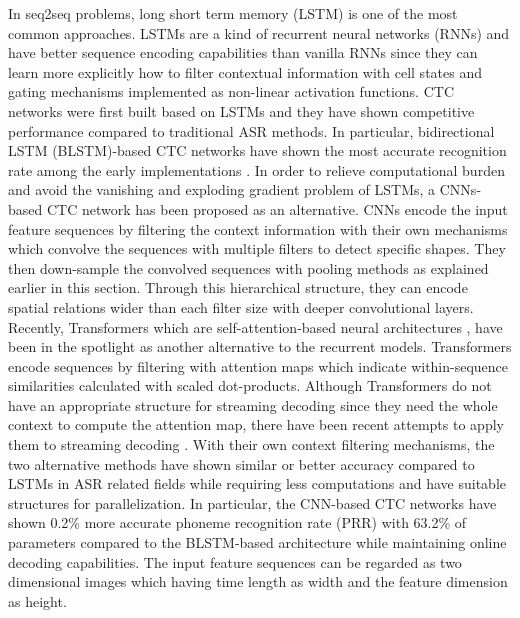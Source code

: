 \documentclass[review]{elsarticle}
\begin{document}
In seq2seq problems, long short term memory (LSTM) \citep{DBLP:journals/neco/HochreiterS97} is one of the most common approaches.
LSTMs are a kind of recurrent neural networks (RNNs) and have better sequence encoding capabilities than vanilla RNNs since they can learn more explicitly how to filter contextual information with cell states and gating mechanisms implemented as non-linear activation functions.
CTC networks were first built based on LSTMs \citep{DBLP:conf/icml/GravesFGS06} and they have shown competitive performance compared to traditional ASR methods.
In particular, bidirectional LSTM (BLSTM)-based CTC networks have shown the most accurate recognition rate among the early implementations \citep{DBLP:conf/icassp/GravesMH13}.
In order to relieve computational burden and avoid the vanishing and exploding gradient problem of LSTMs, a CNNs-based CTC network \citep{DBLP:conf/interspeech/ZhangPBZLBC16} has been proposed as an alternative.
CNNs encode the input feature sequences by filtering the context information with their own mechanisms which convolve the sequences with multiple filters to detect specific shapes.
They then down-sample the convolved sequences with pooling methods as explained earlier in this section.
Through this hierarchical structure, they can encode spatial relations wider than each filter size with deeper convolutional layers.
Recently, Transformers which are self-attention-based neural architectures \citep{DBLP:conf/nips/VaswaniSPUJGKP17}, have been in the spotlight as another alternative to the recurrent models.
Transformers encode sequences by filtering with attention maps which indicate within-sequence similarities calculated with scaled dot-products.
Although Transformers do not have an appropriate structure for streaming decoding since they need the whole context to compute the attention map, there have been recent attempts to apply them to streaming decoding \citep{9054476}.
With their own context filtering mechanisms, the two alternative methods have shown similar or better accuracy compared to LSTMs in ASR related fields \citep{DBLP:conf/interspeech/ZhangPBZLBC16, 8462506, DBLP:journals/corr/abs-1812-06864, 9054476} while requiring less computations and have suitable structures for parallelization.
In particular, the CNN-based CTC networks \citep{DBLP:conf/interspeech/ZhangPBZLBC16} have shown 0.2\% more accurate phoneme recognition rate (PRR) with 63.2\% of parameters compared to the BLSTM-based architecture while maintaining online decoding capabilities.
The input feature sequences can be regarded as two dimensional images which having time length as width and the feature dimension as height.
\end{document}
